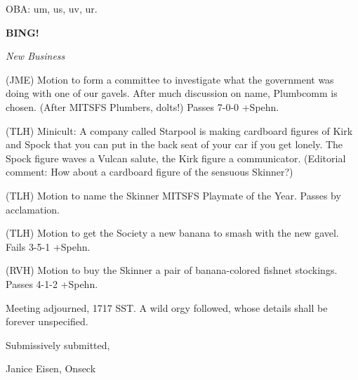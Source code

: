 \documentclass[12pt]{article}
\newcommand{\bing}{{\bf BING!} }
\newcommand{\goto}[1]{\bing \vskip 12pt \centerline{{\em{#1}}}}
\begin{document}
OBA: um, us, uv, ur.

\goto{New Business}

(JME) Motion to form a committee to investigate what the government was doing with one of our gavels. After much discussion on name, Plumbcomm is chosen. (After MITSFS Plumbers, dolts!) Passes 7-0-0 +Spehn.

(TLH) Minicult: A company called Starpool is making cardboard figures of Kirk and Spock that you can put in the back seat of your car if you get lonely. The Spock figure waves a Vulcan salute, the Kirk figure a communicator. (Editorial comment: How about a cardboard figure of the sensuous Skinner?)

(TLH) Motion to name the Skinner MITSFS Playmate of the Year. Passes by acclamation.

(TLH) Motion to get the Society a new banana to smash with the new gavel. Fails 3-5-1 +Spehn.

(RVH) Motion to buy the Skinner a pair of banana-colored fishnet stockings. Passes 4-1-2 +Spehn.

\vspace{12pt}

\noindent
Meeting adjourned, 1717 SST. A wild orgy followed, whose details shall be forever unspecified.

\vspace{18pt}

\centerline{Submissively submitted,}
\centerline{Janice Eisen, Onseck}
\end{document}
